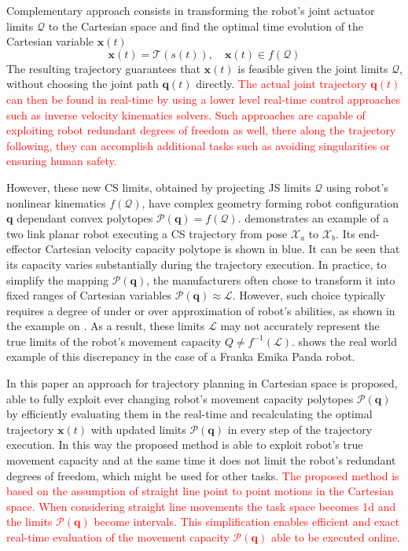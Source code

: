 Complementary approach consists in transforming the robot's joint actuator limits $\mathcal{Q}$ to the Cartesian space and find the optimal time evolution of the Cartesian variable $\bm{x}(t)$
\begin{equation}
\bm{x}(t) = \mathcal{T}(s(t)) , \quad \bm{x}(t) \in f(\mathcal{Q})
\end{equation}
The resulting trajectory guarantees that $\bm{x}(t)$ is feasible given the joint limits $\mathcal{Q}$, without choosing the joint path $\bm{q}(t)$ directly. \textcolor{red}{The actual joint trajectory $\bm{q}(t)$ can then be found in real-time by using a lower level real-time control approaches such as inverse velocity kinematics solvers. Such approaches are capable of exploiting robot redundant degrees of freedom as well, there along the trajectory following, they can accomplish additional tasks such as avoiding singularities \cite{Cheng1995} or ensuring human safety\cite{joseph2020}. }

However, these new CS limits, obtained by projecting JS limits $\mathcal{Q}$ using robot's nonlinear kinematics $f(\mathcal{Q})$, have complex geometry forming robot configuration $\bm{q}$ dependant convex polytopes $\mathcal{P}(\bm{q}) = f(\mathcal{Q})$.  demonstrates an example of a two link planar robot executing a CS trajectory from pose $\mathcal{X}_a$ to $\mathcal{X}_b$. Its end-effector Cartesian velocity capacity polytope is shown in blue. It can be seen that its capacity varies substantially during the trajectory execution. In practice, to simplify the mapping $\mathcal{P}(\bm{q})$, the manufacturers often chose to transform it into fixed ranges of Cartesian variables $\mathcal{P}(\bm{q}) \approx \mathcal{L}$. However, such choice typically requires a degree of under or over approximation of robot's abilities, as shown in the example on . As a result, these limits $\mathcal{L}$ may not accurately represent the true limits of the robot's movement capacity $Q \neq f^{-1}(\mathcal{L})$.  shows the real world example of this discrepancy in the case of a Franka Emika Panda robot. 

In this paper an approach for trajectory planning in Cartesian space is proposed, able to fully exploit ever changing robot's movement capacity polytopes $\mathcal{P}(\bm{q})$ by efficiently evaluating them in the real-time and recalculating the optimal trajectory $\bm{x}(t)$ with updated limits $\mathcal{P}(\bm{q})$ in every step of the trajectory execution. In this way the proposed method is able to exploit robot's true movement capacity and at the same time it does not limit the robot's redundant degrees of freedom, which might be used for other tasks. 
\textcolor{red}{The proposed method is based on the assumption of straight line point to point motions in the Cartesian space. When considering straight line movements the task space becomes 1d and the limits $\mathcal{P}(\bm{q})$ become intervals. This simplification enables efficient and exact real-time evaluation of the movement capacity $\mathcal{P}(\bm{q})$ able to be executed online. }


